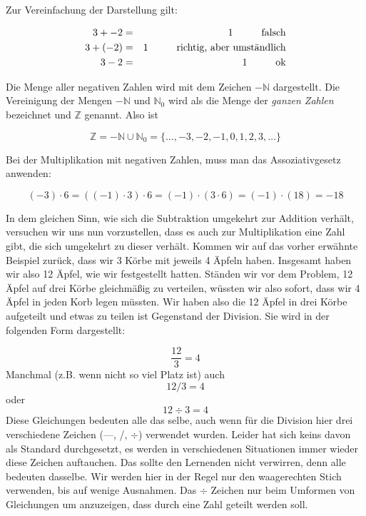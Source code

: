 Zur Vereinfachung der Darstellung gilt:

\begin{eqnarray*}
3 + -2 &=& 1 \hspace{1cm}\textnormal{falsch}\\
3 + (-2) &=& 1 \hspace{1cm}\textnormal{richtig, aber umständlich}\\
3 - 2  &=& 1 \hspace{1cm}\textnormal{ok}
\end{eqnarray*}

Die Menge aller negativen Zahlen wird mit dem Zeichen $-\mathbb{N} $ dargestellt. Die Vereinigung der Mengen $-\mathbb{N} $ und $\mathbb{N}_0$ wird als die Menge der \textsl{ganzen Zahlen} bezeichnet und $\mathbb{Z}$ genannt. Also ist 

\[
\mathbb{Z} = -\mathbb{N} \cup \mathbb{N}_0 =  \{  \dots, -3, -2, -1, 0, 1, 2, 3, \dots \}
\]

Bei der Multiplikation mit negativen Zahlen, muss man das Assoziativgesetz anwenden:

\[ (-3)\cdot 6 = ((-1)\cdot 3) \cdot 6 = (-1)\cdot (3\cdot 6) = (-1)\cdot (18) = -18 \]

In dem gleichen Sinn, wie sich die Subtraktion umgekehrt zur Addition verhält, versuchen wir uns nun vorzustellen, dass es auch zur Multiplikation eine Zahl gibt, die sich umgekehrt zu dieser verhält. Kommen wir auf das vorher erwähnte Beispiel zurück, dass wir 3 Körbe mit jeweils 4 Äpfeln haben. Insgesamt haben wir also 12 Äpfel, wie wir festgestellt hatten. Ständen wir vor dem Problem, 12 Äpfel auf drei Körbe gleichmäßig zu verteilen, wüssten wir also sofort, dass wir 4 Äpfel in jeden Korb legen müssten. Wir haben also die 12 Äpfel in drei Körbe aufgeteilt und etwas zu teilen ist Gegenstand der Division. Sie wird in der folgenden Form dargestellt:

\[ \frac{12}{3} = 4 \] 
Manchmal (z.B. wenn nicht so viel Platz ist) auch
\[ 12 / 3 = 4 \]
oder
\[ 12 \div 3 = 4 \]
Diese Gleichungen bedeuten alle das selbe, auch wenn für die Division hier drei verschiedene Zeichen (---, /, $\div$) verwendet wurden. Leider hat sich keins davon als Standard durchgesetzt, es werden in verschiedenen Situationen immer wieder diese Zeichen auftauchen. Das sollte den Lernenden nicht verwirren, denn alle bedeuten dasselbe. Wir werden hier in der Regel nur den waagerechten Stich verwenden, bis auf wenige Ausnahmen. Das $\div$ Zeichen nur beim Umformen von Gleichungen um anzuzeigen, dass durch eine Zahl geteilt werden soll.

